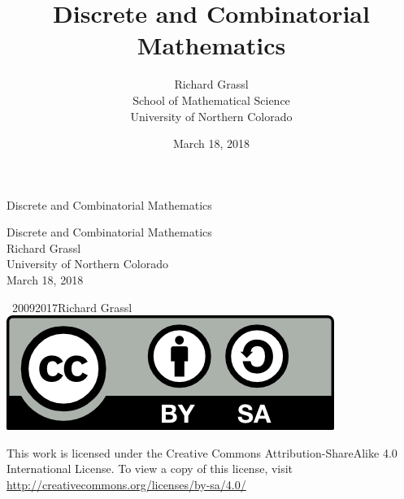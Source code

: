 \documentclass[10pt,]{book}
\title{Discrete and Combinatorial Mathematics}
\author{Richard Grassl\\
School of Mathematical Science\\
University of Northern Colorado
}
\date{March 18, 2018}
\theoremstyle{plain}
\theoremstyle{definition}
\theoremstyle{definition}
\numberwithin{equation}{chapter}
\begin{document}
\frontmatter
\thispagestyle{empty}
{\centering
\vspace*{0.28\textheight}
{\Huge Discrete and Combinatorial Mathematics}\\}
\clearpage
\thispagestyle{empty}
\null%
\clearpage
\thispagestyle{empty}
{\centering
\vspace*{0.14\textheight}
{\Huge Discrete and Combinatorial Mathematics}\\[3\baselineskip]
{\Large Richard Grassl}\\[0.5\baselineskip]
{\Large University of Northern Colorado}\\[3\baselineskip]
{\Large March 18, 2018}\\}
\clearpage
\thispagestyle{empty}
\hypertarget{colophon-1}{}
\noindent\textcopyright\ 2009\textendash{}2017\quad{}Richard Grassl\\[0.5\baselineskip]
\hypertarget{p-1}{}%
\includegraphics[width=0.15\linewidth]{../images/by-sa.png}
%
 \par
\hypertarget{p-2}{}%
This work is licensed under the Creative Commons Attribution-ShareAlike 4.0 International License. To view a copy of this license, visit \href{http://creativecommons.org/licenses/by-sa/4.0/}{http://creativecommons.org/licenses/by-sa/4.0/}%
\par\medskip
{}
\null\clearpage
\setcounter{tocdepth}{2}
\renewcommand*\contentsname{Contents}
\tableofcontents
\mainmatter
\typeout{************************************************}
\typeout{************************************************}
\end{document}
